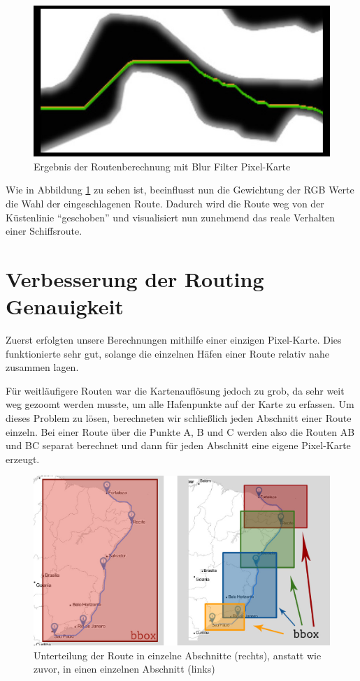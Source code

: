 \documentclass[letterpaper]{article}
\begin{document}

			\begin{figure}[!htbp]
				\centering
				\includegraphics[width=0.7\linewidth]{route_after_blur}
				\caption{Ergebnis der Routenberechnung mit Blur Filter Pixel-Karte}
				\label{fig:route_after_blur}
			\end{figure}

			Wie in Abbildung \ref{fig:route_after_blur} zu sehen ist, beeinflusst nun die Gewichtung der RGB Werte die Wahl der eingeschlagenen Route. Dadurch wird die Route weg von der Küstenlinie "`geschoben"' und visualisiert nun zunehmend das reale Verhalten einer Schiffsroute.

\section{Verbesserung der Routing Genauigkeit}
	Zuerst erfolgten unsere Berechnungen mithilfe einer einzigen Pixel-Karte. Dies funktionierte sehr gut, solange die einzelnen Häfen einer Route relativ nahe zusammen lagen.

	Für weitläufigere Routen war die Kartenauflösung jedoch zu grob, da sehr weit weg gezoomt werden musste, um alle Hafenpunkte auf der Karte zu erfassen.
	Um dieses Problem zu lösen, berechneten wir schließlich jeden Abschnitt einer Route einzeln. Bei einer Route über die Punkte A, B und C werden also die Routen AB und BC separat berechnet und dann für jeden Abschnitt eine eigene Pixel-Karte erzeugt.

	\begin{figure}[!htbp]
		\centering
		\includegraphics[width=\linewidth]{bbox_clipping}
		\caption{Unterteilung der Route in einzelne Abschnitte (rechts), anstatt wie zuvor, in einen einzelnen Abschnitt (links)}
		\label{fig:bbox_clipping}
	\end{figure}
\end{document}
